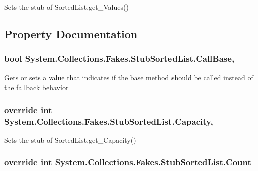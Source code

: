 Sets the stub of Sorted\-List.\-get\-\_\-\-Values()



\subsection{Property Documentation}
\hypertarget{class_system_1_1_collections_1_1_fakes_1_1_stub_sorted_list_a6f78fc93c16d70412b4515760c6495db}{
\subsubsection[{Call\-Base}]{\setlength{\rightskip}{0pt plus 5cm}bool System.\-Collections.\-Fakes.\-Stub\-Sorted\-List.\-Call\-Base\hspace{0.3cm}{\ttfamily [get]}, {\ttfamily [set]}}}\label{class_system_1_1_collections_1_1_fakes_1_1_stub_sorted_list_a6f78fc93c16d70412b4515760c6495db}


Gets or sets a value that indicates if the base method should be called instead of the fallback behavior

\hypertarget{class_system_1_1_collections_1_1_fakes_1_1_stub_sorted_list_ac772f600962424fd819fcd7f7a382165}{
\subsubsection[{Capacity}]{\setlength{\rightskip}{0pt plus 5cm}override int System.\-Collections.\-Fakes.\-Stub\-Sorted\-List.\-Capacity\hspace{0.3cm}{\ttfamily [get]}, {\ttfamily [set]}}}\label{class_system_1_1_collections_1_1_fakes_1_1_stub_sorted_list_ac772f600962424fd819fcd7f7a382165}


Sets the stub of Sorted\-List.\-get\-\_\-\-Capacity()

\hypertarget{class_system_1_1_collections_1_1_fakes_1_1_stub_sorted_list_afb2784d5f409ea1932cdfd526a6d04a4}{
\subsubsection[{Count}]{\setlength{\rightskip}{0pt plus 5cm}override int System.\-Collections.\-Fakes.\-Stub\-Sorted\-List.\-Count\hspace{0.3cm}{\ttfamily [get]}}}\label{class_system_1_1_collections_1_1_fakes_1_1_stub_sorted_list_afb2784d5f409ea1932cdfd526a6d04a4}


